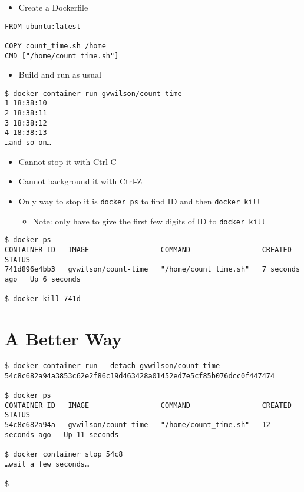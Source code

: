 \documentclass[krantzl]{krantz}
\begin{document}
\begin{itemize}
\item Create a Dockerfile

\end{itemize}
\begin{lstlisting}[frame=tblr]
FROM ubuntu:latest

COPY count_time.sh /home
CMD ["/home/count_time.sh"]
\end{lstlisting}

\begin{itemize}
\item Build and run as usual

\end{itemize}
\begin{lstlisting}[frame=tblr,backgroundcolor=\color{black!5}]
$ docker container run gvwilson/count-time
1 18:38:10
2 18:38:11
3 18:38:12
4 18:38:13
…and so on…
\end{lstlisting}

\begin{itemize}
\item Cannot stop it with Ctrl-C

\item Cannot background it with Ctrl-Z

\item Only way to stop it is \texttt{docker ps} to find ID and then \texttt{docker kill}\begin{itemize}
\item Note: only have to give the first few digits of ID to \texttt{docker kill}

\end{itemize}


\end{itemize}
\begin{lstlisting}[frame=tblr,backgroundcolor=\color{black!5}]
$ docker ps
CONTAINER ID   IMAGE                 COMMAND                 CREATED         STATUS
741d896e4bb3   gvwilson/count-time   "/home/count_time.sh"   7 seconds ago   Up 6 seconds

$ docker kill 741d
\end{lstlisting}

\section{A Better Way}
\begin{lstlisting}[frame=tblr,backgroundcolor=\color{black!5}]
$ docker container run --detach gvwilson/count-time
54c8c682a94a3853c62e2f86c19d463428a01452ed7e5cf85b076dcc0f447474

$ docker ps
CONTAINER ID   IMAGE                 COMMAND                 CREATED          STATUS
54c8c682a94a   gvwilson/count-time   "/home/count_time.sh"   12 seconds ago   Up 11 seconds

$ docker container stop 54c8
…wait a few seconds…

$
\end{lstlisting}
\end{document}
